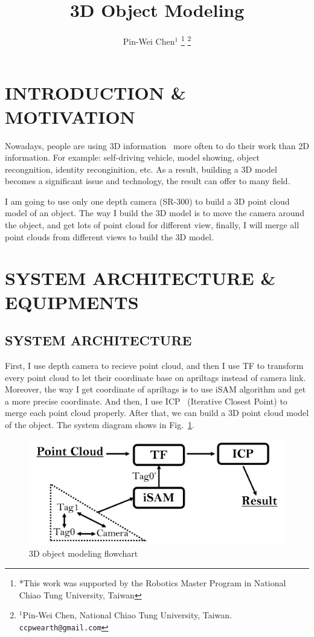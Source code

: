\documentclass[letterpaper, 10 pt, conference]{ieeeconf}  %
\title{\LARGE \bf
3D Object Modeling
}
\author{Pin-Wei Chen$^{1}$%
\thanks{*This work was supported by the Robotics Master Program in National Chiao Tung University, Taiwan}%
\thanks{$^{1}$Pin-Wei Chen, National Chiao Tung University, Taiwan.		{\tt\small ccpwearth@gmail.com}}%
}
\begin{document}
\maketitle
\thispagestyle{empty}
\pagestyle{empty}


\section{INTRODUCTION \& MOTIVATION}

Nowadays, people are using 3D information~\cite{vosselman20013d} more often to do their work than 2D information. For example: self-driving vehicle, model showing, object recongnition, identity reconginition, etc. As a result, building a 3D model becomes a significant issue and technology, the result can offer to many field.

I am going to use only one depth camera (SR-300) to build a 3D point cloud model of an object. The way I build the 3D model is to move the camera around the object, and get lots of point cloud for different view, finally, I will merge all point clouds from different views to build the 3D model.

\section{SYSTEM ARCHITECTURE \& EQUIPMENTS}

\subsection{SYSTEM ARCHITECTURE}

First, I use depth camera to recieve point cloud, and then I use TF to transform every point cloud to let their coordinate base on apriltags instead of camera link. Moreover, the way I get coordinate of apriltags is to use iSAM algorithm and get a more precise coordinate. And then, I use ICP~\cite{rusu20113d} (Iterative Closest Point) to merge each point cloud properly. After that, we can build a 3D point cloud model of the object. The system diagram shows in Fig.~\ref{figure:chart}.
\begin{figure}[h] %
\includegraphics[width=1\columnwidth]{system_diagram}
\centering
\caption{3D object modeling flowchart}
\label{figure:chart}
\end{figure}
\end{document}
